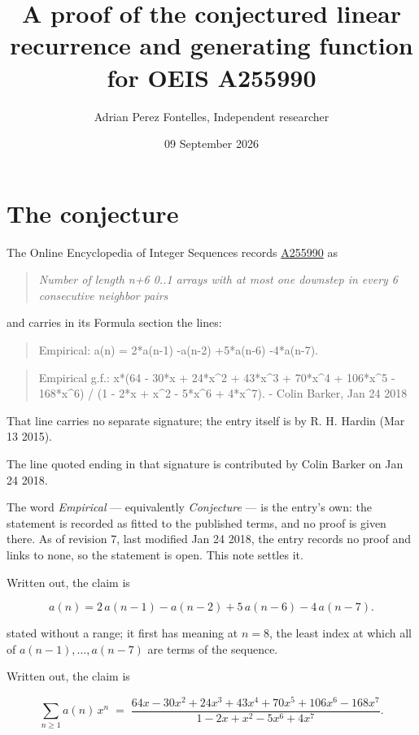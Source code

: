 \documentclass[11pt]{article}
\title{A proof of the conjectured linear recurrence and generating function for OEIS A255990}
\author{Adrian Perez Fontelles, Independent researcher}
\date{09 September 2026}
\theoremstyle{definition}
\begin{document}
\maketitle
\section{The conjecture}

The Online Encyclopedia of Integer Sequences records \href{https://oeis.org/A255990}{A255990} as

\begin{quote}\itshape Number of length n+6 0..1 arrays with at most one downstep in every 6 consecutive neighbor pairs\end{quote}

and carries in its Formula section the lines:

\begin{quote}\ttfamily Empirical: a(n) = 2*a(n-1) -a(n-2) +5*a(n-6) -4*a(n-7).\end{quote}

\begin{quote}\ttfamily Empirical g.f.: x*(64 - 30*x + 24*x\textasciicircum{}2 + 43*x\textasciicircum{}3 + 70*x\textasciicircum{}4 + 106*x\textasciicircum{}5 - 168*x\textasciicircum{}6) / (1 - 2*x + x\textasciicircum{}2 - 5*x\textasciicircum{}6 + 4*x\textasciicircum{}7). - Colin Barker, Jan 24 2018\end{quote}

That line carries no separate signature; the entry itself is by R. H. Hardin (Mar 13 2015).

The line quoted ending in that signature is contributed by Colin Barker on Jan 24 2018.

The word {\itshape Empirical} --- equivalently {\itshape Conjecture} --- is the entry's own: the statement is recorded as fitted to the published terms, and no proof is given there. As of revision 7, last modified Jan 24 2018, the entry records no proof and links to none, so the statement is open. This note settles it.

Written out, the claim is

\[a(n) = 2\,a(n-1) - a(n-2) + 5\,a(n-6) - 4\,a(n-7).\]

stated without a range; it first has meaning at $n = 8$, the least index at which all of $a(n-1),\dots,a(n-7)$ are terms of the sequence.

Written out, the claim is

\[\sum_{n \ge 1} a(n)\,x^n \;=\; \frac{64x - 30x^{2} + 24x^{3} + 43x^{4} + 70x^{5} + 106x^{6} - 168x^{7}}{1 - 2x + x^{2} - 5x^{6} + 4x^{7}}.\]
\end{document}
